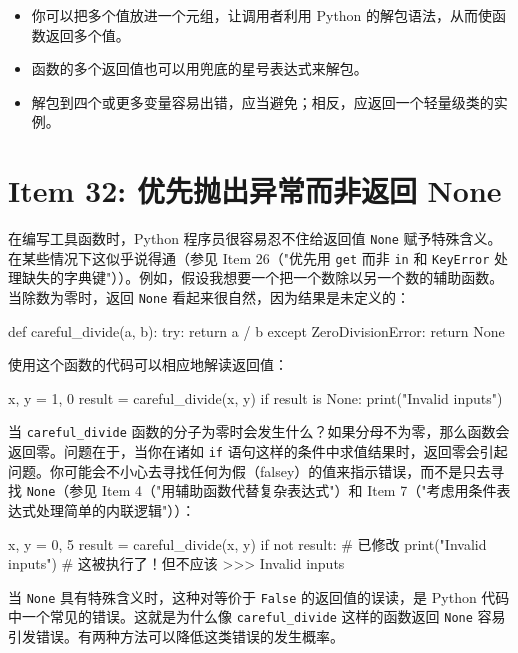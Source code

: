 \begin{itemize}
\item 你可以把多个值放进一个元组，让调用者利用 Python 的解包语法，从而使函数返回多个值。
\item 函数的多个返回值也可以用兜底的星号表达式来解包。
\item 解包到四个或更多变量容易出错，应当避免；相反，应返回一个轻量级类的实例。
\end{itemize}

\section{Item 32: 优先抛出异常而非返回 None}

在编写工具函数时，Python 程序员很容易忍不住给返回值 \texttt{None} 赋予特殊含义。在某些情况下这似乎说得通（参见 Item 26（"优先用 \texttt{get} 而非 \texttt{in} 和 \texttt{KeyError} 处理缺失的字典键"））。例如，假设我想要一个把一个数除以另一个数的辅助函数。当除数为零时，返回 \texttt{None} 看起来很自然，因为结果是未定义的：

\begin{codebox}[python]
def careful_divide(a, b):
    try:
        return a / b
    except ZeroDivisionError:
        return None
\end{codebox}

使用这个函数的代码可以相应地解读返回值：

\begin{codebox}[python]
x, y = 1, 0
result = careful_divide(x, y)
if result is None:
    print("Invalid inputs")
\end{codebox}

当 \texttt{careful\_divide} 函数的分子为零时会发生什么？如果分母不为零，那么函数会返回零。问题在于，当你在诸如 \texttt{if} 语句这样的条件中求值结果时，返回零会引起问题。你可能会不小心去寻找任何为假（falsey）的值来指示错误，而不是只去寻找 \texttt{None}（参见 Item 4（"用辅助函数代替复杂表达式"）和 Item 7（"考虑用条件表达式处理简单的内联逻辑"））：

\begin{codebox}[python]
x, y = 0, 5
result = careful_divide(x, y)
if not result:               # 已修改
    print("Invalid inputs")  # 这被执行了！但不应该
>>>
Invalid inputs
\end{codebox}

当 \texttt{None} 具有特殊含义时，这种对等价于 \texttt{False} 的返回值的误读，是 Python 代码中一个常见的错误。这就是为什么像 \texttt{careful\_divide} 这样的函数返回 \texttt{None} 容易引发错误。有两种方法可以降低这类错误的发生概率。

